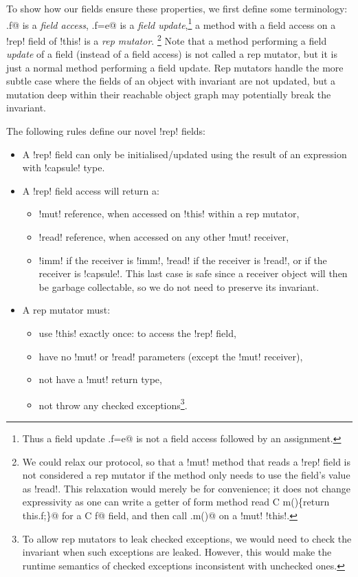 To show how our \Q@rep@ fields ensure these properties, we first define some terminology:
\Q@x.f@ is a \emph{field access}, \Q@x.f=e@ is a \emph {field update},\footnote{Thus a field update \Q@x.f=e@ is not a field access followed by an assignment.}
a \Q@mut@ method with a field access on a \Q!rep! field of \Q!this! is a \emph{rep mutator}.
\footnote{
We could relax our protocol,
so that a \Q!mut! method that reads a \Q!rep! field is not considered a rep mutator if the method only needs to use the field's value as \Q!read!.
This relaxation would merely be for convenience; it does not change expressivity as one can write a getter of form
\Q@read method read C m()\{return this.f;\}@
for a \Q@rep C f@ field,
and then call \Q@this.m()@ on a \Q!mut! \Q!this!.%
} 
Note that a method performing a field \emph{update} of a \Q@rep@ field (instead of a field access) is not called a rep mutator, but it is just a normal method performing a field update.
Rep mutators handle the more subtle case where the fields of an object with invariant are not updated, but a mutation deep within their reachable object graph may potentially break the invariant.

The following rules define our novel \Q!rep! fields:
\begin{itemize}
\item A \Q!rep! field can only be initialised/updated using the result of an expression with  \Q!capsule! type.
\item A \Q!rep! field access will return a:
\begin{itemize}
\item \Q!mut! reference, when accessed on \Q!this! within a rep mutator,
\item \Q!read! reference, when accessed on any other \Q!mut! receiver,
\item \Q!imm! if the receiver is \Q!imm!, \Q!read! if the receiver is \Q!read!, or \Q@capsule@ if the receiver is
\Q!capsule!. This last case is safe since a \Q@capsule@ receiver object will then be garbage collectable, so we do not need to preserve its invariant.
\end{itemize}
\item A rep mutator must:
\begin{itemize}
\item use \Q!this! exactly once: to access the \Q!rep! field,
\item have no \Q!mut! or \Q!read! parameters (except the \Q!mut! receiver),
\item not have a \Q!mut! return type,
\item not throw any checked exceptions\footnote{To allow rep mutators to leak checked exceptions, we would need to check the invariant when such exceptions are leaked. However, this would make the runtime semantics of checked exceptions inconsistent with unchecked ones.}.
\end{itemize}
\end{itemize}	

